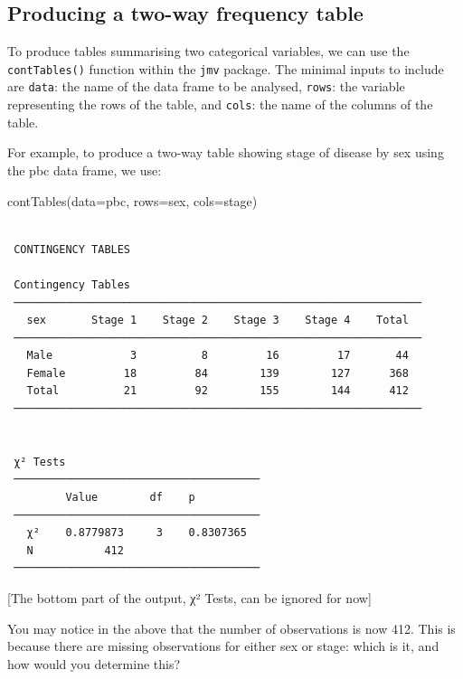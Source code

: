 \documentclass[
  a4paper,
]{memoir}
\newenvironment{Shaded}{\begin{snugshade}}{\end{snugshade}}
\newcommand{\AttributeTok}[1]{\textcolor[rgb]{0.00,0.00,0.00}{#1}}
\newcommand{\FunctionTok}[1]{\textcolor[rgb]{0.00,0.00,0.00}{#1}}
\newcommand{\NormalTok}[1]{\textcolor[rgb]{0.00,0.00,0.00}{#1}}
\begin{document}
\hypertarget{producing-a-two-way-frequency-table-1}{%
\subsection{Producing a two-way frequency
table}\label{producing-a-two-way-frequency-table-1}}

To produce tables summarising two categorical variables, we can use the
\texttt{contTables()} function within the \texttt{jmv} package. The
minimal inputs to include are \texttt{data}: the name of the data frame
to be analysed, \texttt{rows}: the variable representing the rows of the
table, and \texttt{cols}: the name of the columns of the table.

For example, to produce a two-way table showing stage of disease by sex
using the pbc data frame, we use:

\begin{Shaded}
\begin{Highlighting}[]
\FunctionTok{contTables}\NormalTok{(}\AttributeTok{data=}\NormalTok{pbc, }\AttributeTok{rows=}\NormalTok{sex, }\AttributeTok{cols=}\NormalTok{stage)}
\end{Highlighting}
\end{Shaded}

\begin{verbatim}

 CONTINGENCY TABLES

 Contingency Tables                                              
 ─────────────────────────────────────────────────────────────── 
   sex       Stage 1    Stage 2    Stage 3    Stage 4    Total   
 ─────────────────────────────────────────────────────────────── 
   Male            3          8         16         17       44   
   Female         18         84        139        127      368   
   Total          21         92        155        144      412   
 ─────────────────────────────────────────────────────────────── 


 χ² Tests                               
 ────────────────────────────────────── 
         Value        df    p           
 ────────────────────────────────────── 
   χ²    0.8779873     3    0.8307365   
   N           412                      
 ────────────────────────────────────── 
\end{verbatim}

{[}The bottom part of the output, χ² Tests, can be ignored for now{]}

You may notice in the above that the number of observations is now 412.
This is because there are missing observations for either sex or stage:
which is it, and how would you determine this?
\end{document}
